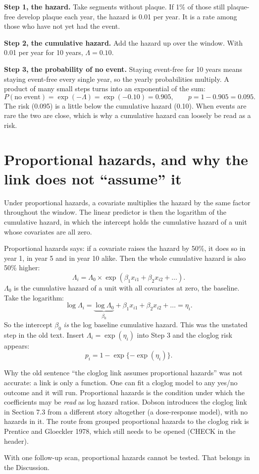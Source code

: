 \documentclass[11pt]{article}
\begin{document}
\textbf{Step 1, the hazard.} Take segments without plaque. If 1\% of those still plaque-free develop
plaque each year, the hazard is 0.01 per year. It is a rate among those who have not yet had the
event.

\textbf{Step 2, the cumulative hazard.} Add the hazard up over the window. With 0.01 per year for
10 years, $\Lambda = 0.10$.

\textbf{Step 3, the probability of no event.} Staying event-free for 10 years means staying
event-free every single year, so the yearly probabilities multiply. A product of many small steps
turns into an exponential of the sum:
\[
  P(\text{no event}) = \exp(-\Lambda) = \exp(-0.10) = 0.905,
  \qquad
  p = 1 - 0.905 = 0.095 .
\]
The risk (0.095) is a little below the cumulative hazard (0.10). When events are rare the two are
close, which is why a cumulative hazard can loosely be read as a risk.

\section{Proportional hazards, and why the link does not ``assume'' it}

\begin{thesisline}
Under proportional hazards, a covariate multiplies the hazard by the same factor throughout the
window. The linear predictor is then the logarithm of the cumulative hazard, in which the intercept
holds the cumulative hazard of a unit whose covariates are all zero.
\end{thesisline}

Proportional hazards says: if a covariate raises the hazard by 50\%, it does so in year 1, in year 5
and in year 10 alike. Then the whole cumulative hazard is also 50\% higher:
\[
  \Lambda_i = \Lambda_0 \times \exp(\beta_1 x_{i1} + \beta_2 x_{i2} + \dots) .
\]
$\Lambda_0$ is the cumulative hazard of a unit with all covariates at zero, the baseline. Take the
logarithm:
\[
  \log \Lambda_i = \underbrace{\log \Lambda_0}_{\beta_0} + \beta_1 x_{i1} + \beta_2 x_{i2} + \dots = \eta_i .
\]
So the intercept $\beta_0$ \emph{is} the log baseline cumulative hazard. This was the unstated step
in the old text. Insert $\Lambda_i = \exp(\eta_i)$ into Step 3 and the cloglog risk appears:
\[
  p_i = 1 - \exp\{-\exp(\eta_i)\} .
\]

\begin{mine}
Why the old sentence ``the cloglog link assumes proportional hazards'' was not accurate: a link is
only a function. One can fit a cloglog model to any yes/no outcome and it will run. Proportional
hazards is the condition under which the coefficients may be \emph{read} as log hazard ratios.
Dobson introduces the cloglog link in Section 7.3 from a different story altogether (a dose-response
model), with no hazards in it. The route from grouped proportional hazards to the cloglog risk is
Prentice and Gloeckler 1978, which still needs to be opened (CHECK in the header).

With one follow-up scan, proportional hazards cannot be tested. That belongs in the Discussion.
\end{mine}
\end{document}

